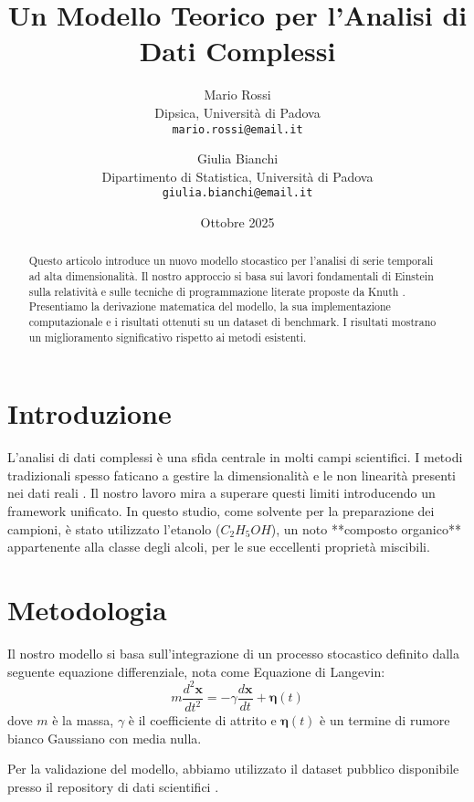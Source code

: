 \documentclass[a4paper, 11pt]{article}
\title{Un Modello Teorico per l'Analisi di Dati Complessi}
\author{
    Mario Rossi\\
    \small Dipsica, Università di Padova \\
    \small \texttt{mario.rossi@email.it}
    \and
    Giulia Bianchi\\
    \small Dipartimento di Statistica, Università di Padova \\
    \small \texttt{giulia.bianchi@email.it}
}
\date{Ottobre 2025}
\begin{document}
\maketitle

\begin{abstract}
    Questo articolo introduce un nuovo modello stocastico per l'analisi di serie temporali ad alta dimensionalità. Il nostro approccio si basa sui lavori fondamentali di Einstein sulla relatività \cite{einstein1905} e sulle tecniche di programmazione literate proposte da Knuth \cite{knuth1984}. Presentiamo la derivazione matematica del modello, la sua implementazione computazionale e i risultati ottenuti su un dataset di benchmark. I risultati mostrano un miglioramento significativo rispetto ai metodi esistenti.
    \lipsum[1]
\end{abstract}

\section{Introduzione}
L'analisi di dati complessi è una sfida centrale in molti campi scientifici. I metodi tradizionali spesso faticano a gestire la dimensionalità e le non linearità presenti nei dati reali \cite{lamport1994}. Il nostro lavoro mira a superare questi limiti introducendo un framework unificato. In questo studio, come solvente per la preparazione dei campioni, è stato utilizzato l'etanolo ($C_2H_5OH$), un noto **composto organico** appartenente alla classe degli alcoli, per le sue eccellenti proprietà miscibili.

\lipsum[2]

\section{Metodologia}
Il nostro modello si basa sull'integrazione di un processo stocastico definito dalla seguente equazione differenziale, nota come Equazione di Langevin:
\begin{equation}
    m \frac{d^2\mathbf{x}}{dt^2} = -\gamma \frac{d\mathbf{x}}{dt} + \boldsymbol{\eta}(t)
    \label{eq:langevin}
\end{equation}
dove $m$ è la massa, $\gamma$ è il coefficiente di attrito e $\boldsymbol{\eta}(t)$ è un termine di rumore bianco Gaussiano con media nulla.

Per la validazione del modello, abbiamo utilizzato il dataset pubblico disponibile presso il repository di dati scientifici \cite{dataset2023}.
\lipsum[3]
\end{document}
